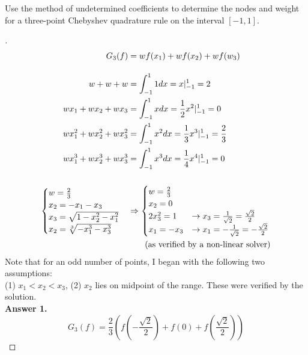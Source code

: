 \documentclass[12pt]{article}
\newenvironment{exercise}[2][Exercise]{\begin{trivlist}
\item[\hskip \labelsep {\bfseries #1}\hskip \labelsep {\bfseries #2.}]}{\end{trivlist}}
\begin{document}
\begin{exercise}{1}
	Use the method of undetermined coefficients to determine the nodes and weight for a three-point Chebyshev quadrature rule on the interval $[-1,1]$.
\end{exercise} \vspace{-10mm}
\begin{proof}[]
	\begin{align*}
		G_3(f) &= w f(x_1) + w f(x_2) + w f(w_3) \\[10pt]
		w + w + w &= \int_{-1}^{1} 1 dx = x|_{-1}^{1} = 2 \\
		w x_1 + w x_2 + w x_3 &= \int_{-1}^{1} x dx = \frac{1}{2}x^2|_{-1}^{1} = 0 \\
		w x_1^2 + w x_2^2 + w x_3^2 &= \int_{-1}^{1} x^2 dx = \frac{1}{3}x^3|_{-1}^{1} = \frac{2}{3} \\
		w x_1^3 + w x_2^3 + w x_3^3 &= \int_{-1}^{1} x^3 dx = \frac{1}{4}x^4|_{-1}^{1} = 0 \\[15pt]
		\begin{cases}
			w = \frac{2}{3} \\
			x_2 = - x_1 - x_3 \\
			x_3 = \sqrt{1 - x_2^2 - x_1^2} \\
			x_2 = \sqrt[3]{- x_1^3 - x_3^3}
		\end{cases}
		& \Rightarrow \begin{cases}
			w = \frac{2}{3} \\
			x_2 = 0 \\
			2 x_3^2 = 1 &\rightarrow x_3 = \frac{1}{\sqrt{2}} = \frac{\sqrt{2}}{2} \\
			x_1 = - x_3 &\rightarrow x_1 = -\frac{1}{\sqrt{2}} = -\frac{\sqrt{2}}{2}\\
		\end{cases} \\
		& \qquad \textnormal{(as verified by a non-linear solver)}
	\end{align*}
	Note that for an odd number of points, I began with the following two assumptions: \\
		(1) $x_1 < x_2 < x_3 $, (2) $x_2$ lies on midpoint of the range. These were verified by the solution. \vspace{2mm} \\
	\textbf{Answer 1.} %
	\[ G_3(f) = \frac{2}{3} \left( f\left( -\frac{\sqrt{2}}{2}\right)  +  f(0) + f\left( \frac{\sqrt{2}}{2}\right) \right)   \]
\end{proof}
\end{document}
